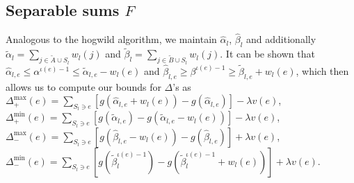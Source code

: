 \documentclass{article} %
\newtheorem{cor}[thm]{Corollary}
\newtheorem{lem}[thm]{Lemma}
\begin{document}
\subsection{Separable sums $F$}
Analogous to the hogwild algorithm, we maintain $\hat\alpha_l$, $\hat\beta_l$ and additionally $\tilde\alpha_l = \sum_{j\in \tilde{A}\cup S_l} w_l(j)$ and $\tilde\beta_l = \sum_{j \in \tilde{B}\cup S_l} w_l(j)$.
It can be shown that $\hat\alpha_{l,e} \leq \alpha^{\iota(e)-1} \leq \tilde\alpha_{l,e} - w_l(e)$ and $\hat\beta_{l,e} \geq \beta^{\iota(e)-1} \geq \tilde\beta_{l,e} + w_l(e)$, which then allows us to compute our bounds for $\Delta$'s as
$\Delta_+^{\max}(e) = \sum_{S_l \ni e} \left[g(\hat\alpha_{l,e} + w_l(e)) - g(\hat\alpha_{l,e})\right] - \lambda v(e)$, 
$\Delta_+^{\min}(e) = \sum_{S_l \ni e} \left[g(\tilde\alpha_{l,e}) - g(\tilde\alpha_{l,e} - w_l(e))\right] - \lambda v(e)$,
$\Delta_-^{\max}(e) = \sum_{S_l \ni e} \left[g(\hat\beta_{l,e} - w_l(e)) - g(\hat\beta_{l,e})\right] + \lambda v(e)$,
$\Delta_-^{\min}(e) = \sum_{S_l \ni e} \left[g(\tilde\beta_l^{\iota(e)-1}) - g(\tilde\beta_l^{\iota(e)-1} + w_l(e))\right] + \lambda v(e)$.

%
\end{document}
